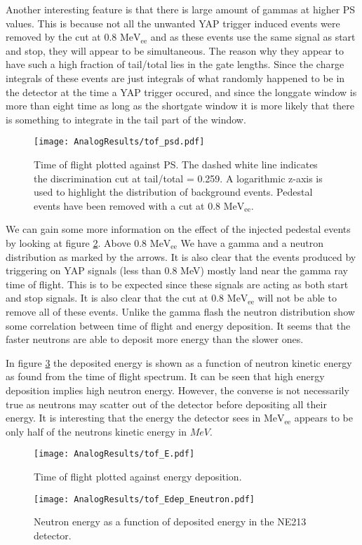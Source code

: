 \documentclass[main.tex]{subfiles}
\begin{document}
Another interesting feature is that there is large amount of gammas at higher PS values. This is because not all the unwanted YAP trigger induced events were removed by the cut at 0.8 $\text{MeV}_\text{ee}$ and as these events use the same signal as start and stop, they will appear to be simultaneous. The reason why they appear to have such a high fraction of tail/total lies in the gate lengths. Since the charge integrals of these events are just integrals of what randomly happened to be in the detector at the time a YAP trigger occured, and since the longgate window is more than eight time as long as the shortgate window it is more likely that there is something to integrate in the tail part of the window.
\begin{figure}[ht]
    \centering
        \texttt{[image: AnalogResults/tof\_psd.pdf]}
        \caption{Time of flight plotted against PS. The dashed white line indicates the discrimination cut at tail/total = 0.259. A logarithmic z-axis is used to highlight the distribution of background events. Pedestal events have been removed with a cut at 0.8 $\text{MeV}_\text{ee}$.}
    \label{fig:tof_ps_a} 
\end{figure}

We can gain some more information on the effect of the injected pedestal events by looking at figure \ref{fig:tof_E_a}. Above 0.8 $\text{MeV}_\text{ee}$ We have a gamma and a neutron distribution as marked by the arrows. It is also clear that the events produced by triggering on YAP signals (less than 0.8 MeV) mostly land near the gamma ray time of flight. This is to be expected since these signals are acting as both start and stop signals. It is also clear that the cut at 0.8 $\text{MeV}_\text{ee}$ will not be able to remove all of these events. Unlike the gamma flash the neutron distribution show some correlation between time of flight and energy deposition. It seems that the faster neutrons are able to deposit more energy than the slower ones.

In figure \ref{fig:tof_Edep_Eneutron_a} the deposited energy is shown as a function of neutron kinetic energy as found from the time of flight spectrum. It can be seen that high energy deposition implies high neutron energy. However, the converse is not necessarily true as neutrons may scatter out of the detector before depositing all their energy. It is interesting that the energy the detector sees in $\text{MeV}_\text{ee}$ appears to be only half of the neutrons kinetic energy in  $MeV$.

\begin{figure}[ht]
    \centering
        \texttt{[image: AnalogResults/tof\_E.pdf]}
        \caption{Time of flight plotted against energy deposition.}
    \label{fig:tof_E_a} 
\end{figure}

\begin{figure}[ht]
    \centering
        \texttt{[image: AnalogResults/tof\_Edep\_Eneutron.pdf]}
        \caption{Neutron energy as a function of deposited energy in the NE213 detector.}
    \label{fig:tof_Edep_Eneutron_a} 
\end{figure}
\end{document}
